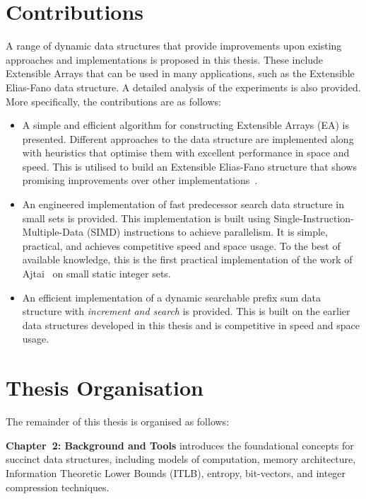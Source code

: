 \section{Contributions}
A range of dynamic data structures that provide improvements upon existing approaches and implementations is proposed in this thesis. These include Extensible Arrays that can be used in many applications, such as the Extensible Elias-Fano data structure. A detailed analysis of the experiments is also provided. More specifically, the contributions are as follows:

\begin{itemize}
    \item A simple and efficient algorithm for constructing Extensible Arrays (EA) is presented. Different approaches to the data structure are implemented along with heuristics that optimise them with excellent performance in space and speed. This is utilised to build an Extensible Elias-Fano structure that shows promising improvements over other implementations~\cite{Pibiri_2017}.

    \item An engineered implementation of fast predecessor search data structure in small sets is provided. This implementation is built using Single-Instruction-Multiple-Data (SIMD) instructions to achieve parallelism. It is simple, practical, and achieves competitive speed and space usage. To the best of available knowledge, this is the first practical implementation of the work of Ajtai~\cite{AJTAI1984217} on small static integer sets.

    \item An efficient implementation of a dynamic searchable prefix sum data structure with \textit{increment and search} is provided. This is built on the earlier data structures developed in this thesis and is competitive in speed and space usage.
\end{itemize}

\section{Thesis Organisation}
The remainder of this thesis is organised as follows:

\textbf{Chapter~2: Background and Tools} introduces the foundational concepts for succinct data structures, including models of computation, memory architecture, Information Theoretic Lower Bounds (ITLB), entropy, bit-vectors, and integer compression techniques.

